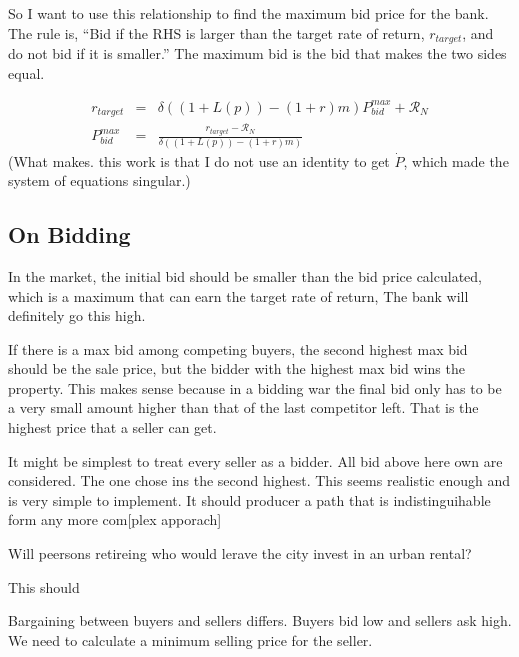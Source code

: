 So I want to use this relationship to find the maximum bid price for the bank. The rule is, ``Bid if the RHS is larger than the target rate of return, $r_{target}$, and do not bid if it is smaller.''  The maximum bid  is the bid that makes the two sides equal. 

{\color{red}
\begin{eqnarray}
r_{target}&=& \delta\left( (1+L(p)) - (1+r)m \right) P^{max}_{bid} + \mathcal{R}_N  \nonumber\\
   P^{max}_{bid} &=&\frac{r_{target}-\mathcal{R}_N}{\delta\left( (1+L(p)) - (1+r)m \right)} \label{EqBidPrice} 
\end{eqnarray}}
(What makes. this work is that I do not use an identity to get
$\dot P$, which made the system of equations singular.)
\newpage

\subsection{On Bidding}

In the market, the initial bid should be smaller than the bid price calculated, which is a maximum that can earn the target rate of return, The bank will definitely go this high. 

If there is a  max bid among competing buyers, the second highest max bid should be the sale price, but the bidder with the highest max bid wins the property. This makes sense because in a bidding war the final bid only has to be a very small amount higher than that of the last competitor left.
That is the highest price that a seller can get.

It might be simplest to treat every seller as a bidder. All bid above here own are considered. The one chose ins the second highest. This  seems realistic enough and is very simple to implement. It should producer a path that is indistinguihable form any more com[plex apporach] 

Will peersons retireing who would lerave the city invest in an urban rental?

This should 


Bargaining between buyers and sellers differs. Buyers bid low and sellers ask high.  {\color{red}We need to calculate a minimum selling price for the seller}.





